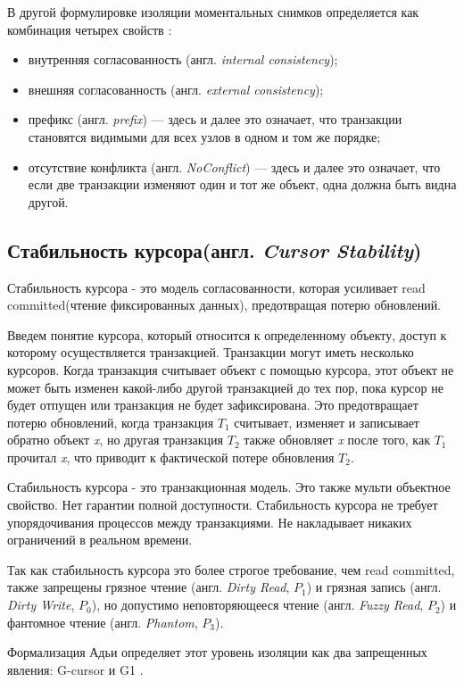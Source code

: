 \documentclass[12pt,  openany]{book}
\begin{document}
\par
В другой формулировке изоляции моментальных снимков определяется как комбинация четырех свойств  \cite{cerone_et_al}:
\begin{itemize}
\item внутренняя согласованность (англ. \textit{internal consistency});
\item внешняя согласованность (англ. \textit{external consistency});
\item префикс (англ. \textit{prefix}) --- здесь и далее это означает, что транзакции становятся видимыми для всех узлов в одном и том же порядке;
\item отсутствие конфликта (англ. \textit{NoConflict}) --- здесь и далее это означает, что если две транзакции изменяют один и тот же объект, одна должна быть видна другой.
\end{itemize}

\subsection{Стабильность курсора(англ.  \textit{Cursor Stability})}
Стабильность курсора - это модель согласованности, которая усиливает read committed(чтение фиксированных данных), предотвращая потерю обновлений.
\par
Введем понятие курсора, который относится к определенному объекту, доступ к которому осуществляется транзакцией. Транзакции могут иметь несколько курсоров. Когда транзакция считывает объект с помощью курсора, этот объект не может быть изменен какой-либо другой транзакцией до тех пор, пока курсор не будет отпущен или транзакция не будет зафиксирована.
Это предотвращает потерю обновлений, когда транзакция $T_1$ считывает, изменяет и записывает обратно объект \textit{x}, но другая транзакция $T_2$ также обновляет \textit{x} после того, как $T_1$ прочитал \textit{x}, что приводит к фактической потере обновления $T_2$.
\par
Стабильность курсора - это транзакционная модель. Это также мульти объектное свойство.
Нет гарантии полной доступности. Стабильность курсора не требует упорядочивания процессов между транзакциями. Не накладывает никаких ограничений в реальном времени.
\par
Так как стабильность курсора это более строгое требование, чем read committed, также запрещены грязное чтение (англ.  \textit{Dirty Read},  $P_1$) и грязная запись (англ. \textit{Dirty Write}, $P_0$), но допустимо неповторяющееся чтение (англ. \textit{Fuzzy Read}, $P_2$) и фантомное чтение (англ. \textit{Phantom}, $P_3$).
\par
Формализация Адьи определяет этот уровень изоляции как два запрещенных явления: G-cursor и G1  \cite{adya99:_weak_consis}.
\end{document}
